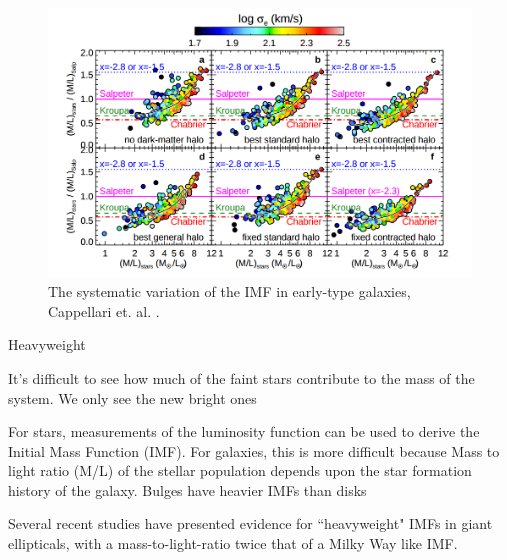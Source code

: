\begin{figure}[H]
\centering
\includegraphics[width=12cm]{images/IMFs_paper.png}
\caption[The systematic variation of the IMF in early-type galaxies.]{The systematic variation of the IMF in early-type galaxies, Cappellari et. al. \citeyear{Reference19}.}
\end{figure}

Heavyweight

It's difficult to see how much of the faint stars contribute to the mass of the system. We only see the new bright ones

For stars, measurements of the luminosity function can be used to derive the Initial Mass Function (IMF). For galaxies, this is more difficult because Mass to light ratio (M/L) of the stellar population depends upon the star formation history of the galaxy. Bulges have heavier IMFs than disks

Several recent studies have presented evidence for ``heavyweight" IMFs in giant ellipticals, with a mass-to-light-ratio twice that of a Milky Way like IMF. 
